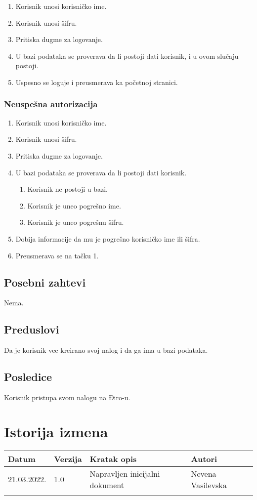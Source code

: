 \documentclass[12pt]{article}
\begin{document}
\begin{enumerate}
    \item Korisnik unosi korisničko ime.
    \item Korisnik unosi šifru.
    \item Pritiska dugme za logovanje.
    \item U bazi podataka se proverava da li postoji dati korisnik, i u ovom slučaju postoji.
    \item Uspesno se loguje i preusmerava ka početnoj stranici.
\end{enumerate}

\subsubsection{Neuspešna autorizacija}

\begin{enumerate}
    \item Korisnik unosi korisničko ime.
    \item Korisnik unosi šifru.
    \item Pritiska dugme za logovanje.
    \item U bazi podataka se proverava da li postoji dati korisnik.
    \begin{enumerate}
	\item Korisnik ne postoji u bazi.
    \item Korisnik je uneo pogrešno ime.
    \item Korisnik je uneo pogrešnu šifru.
    \end{enumerate}
    \item Dobija informacije da mu je pogrešno korisničko ime ili šifra.
    \item Preusmerava se na tačku 1.
\end{enumerate}

\subsection{Posebni zahtevi}
Nema.
\subsection{Preduslovi}
Da je korisnik vec kreirano svoj nalog i da ga ima u bazi podataka.
\subsection{Posledice}
Korisnik pristupa svom nalogu na Điro-u.

\section{Istorija izmena}
\begin{center}
\begin{tabular}{ | m{2cm} | m{1.5cm}| m{6cm} | m{5cm} | } 
\hline
Datum & Verzija & Kratak opis & Autori \\ 
\hline
 21.03.2022. & 1.0 & Napravljen inicijalni dokument & Nevena Vasilevska\\ 
\hline
&&&\\ 
\hline
\end{tabular}
\end{center}
\end{document}

